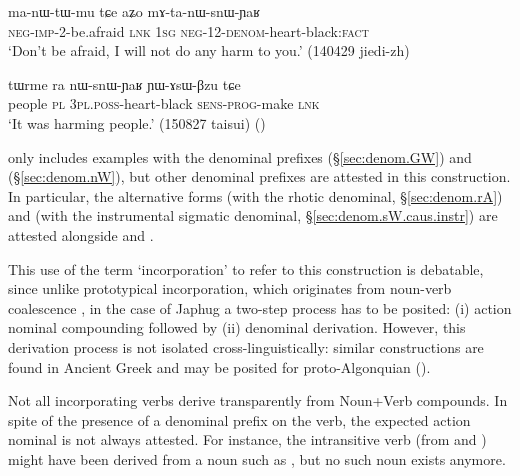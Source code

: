 \begin{exe}
\ex \label{ex:mAtnWsnWYAR}
\gll ma-nɯ-tɯ-mu tɕe aʑo  mɤ-ta-nɯ-snɯ-ɲaʁ \\
\textsc{neg}-\textsc{imp}-2-be.afraid \textsc{lnk} \textsc{1sg} \textsc{neg}-1\fl{}2-\textsc{denom}-heart-black:\textsc{fact} \\
 \glt `Don't be afraid, I will not do any harm to you.' (140429 jiedi-zh)
\end{exe}

\begin{exe}
\ex \label{ex:nWsnWYaR}
\gll   tɯrme ra nɯ-snɯ-ɲaʁ ɲɯ-ɤsɯ-βzu tɕe \\
people \textsc{pl} \textsc{3pl}.\textsc{poss}-heart-black \textsc{sens}-\textsc{prog}-make \textsc{lnk} \\
 \glt `It was harming people.' (150827 taisui)
 ()
 \end{exe}  
  
 only includes examples with the denominal prefixes  (§\ref{sec:denom.GW}) and  (§\ref{sec:denom.nW}), but other denominal prefixes are attested in this construction. In particular, the alternative forms  (with the rhotic denominal, §\ref{sec:denom.rA}) and   (with the instrumental sigmatic denominal, §\ref{sec:denom.sW.caus.instr}) are attested alongside   and .
 
This use of the term `incorporation' to refer to this construction is debatable, since unlike prototypical incorporation, which originates from noun-verb coalescence \citep{mithun84incorp}, in the case of Japhug a two-step process has to be posited: (i) action nominal compounding followed by (ii) denominal derivation. However, this derivation process is not isolated cross-linguistically: similar constructions are found in Ancient Greek \citep{benveniste66incorp} and may be posited for proto-Algonquian (\citealt{garrett04stem.structure,jacques12incorp}). 
 
Not all incorporating verbs derive transparently from Noun+Verb compounds. In spite of the presence of a denominal prefix on the verb, the expected action nominal is not always attested. For instance, the intransitive verb  (from   and  ) might have been derived from a noun such as , but no such noun exists anymore.


